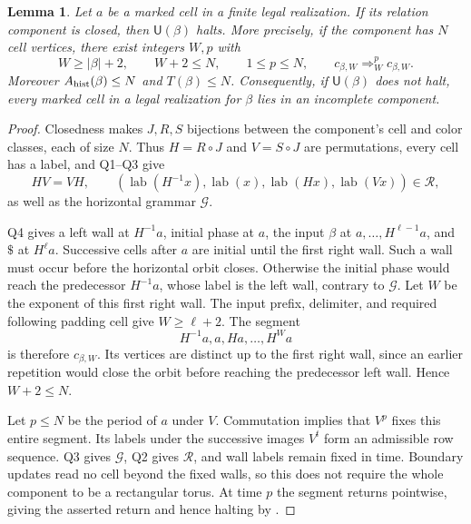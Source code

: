\documentclass[10pt]{article}
\numberwithin{equation}{section}
\newtheorem{lemma}[lemma]{Lemma}\aliascntresetthe{lemma}
\theoremstyle{definition}
\begin{document}
\begin{lemma}
\label{lem:two-type-closed-recovery}
Let $a$ be a marked cell in a finite legal realization. If its relation component is closed, then $\mathsf U(\beta)$ halts. More precisely, if the component has $N$ cell vertices, there exist integers $W,p$ with
\[
 W\ge|\beta|+2,\qquad W+2\le N,\qquad1\le p\le N,
 \qquad c_{\beta,W}\Rightarrow_W^p c_{\beta,W}.
\]
Moreover $A_{\rm hist}(\beta)\le N$ and $T(\beta)\le N$. Consequently, if $\mathsf U(\beta)$ does not halt, every marked cell in a legal realization for $\beta$ lies in an incomplete component.
\end{lemma}
\begin{proof}
Closedness makes $J,R,S$ bijections between the component's cell and color classes, each of size $N$. Thus $H=R\circ J$ and $V=S\circ J$ are permutations, every cell has a label, and Q1--Q3 give
\[
 HV=VH,\qquad
 (\operatorname{lab}(H^{-1}x),\operatorname{lab}(x),
 \operatorname{lab}(Hx),\operatorname{lab}(Vx))\in\mathcal R,
\]
as well as the horizontal grammar $\mathcal G$.

Q4 gives a left wall at $H^{-1}a$, initial phase at $a$, the input $\beta$ at $a,\ldots,H^{\ell-1}a$, and $\mathtt\$$ at $H^\ell a$. Successive cells after $a$ are initial until the first right wall. Such a wall must occur before the horizontal orbit closes. Otherwise the initial phase would reach the predecessor $H^{-1}a$, whose label is the left wall, contrary to $\mathcal G$. Let $W$ be the exponent of this first right wall. The input prefix, delimiter, and required following padding cell give $W\ge\ell+2$. The segment
\[
 H^{-1}a,a,Ha,\ldots,H^W a
\]
is therefore $c_{\beta,W}$. Its vertices are distinct up to the first right wall, since an earlier repetition would close the orbit before reaching the predecessor left wall. Hence $W+2\le N$.

Let $p\le N$ be the period of $a$ under $V$. Commutation implies that $V^p$ fixes this entire segment. Its labels under the successive images $V^t$ form an admissible row sequence. Q3 gives $\mathcal G$, Q2 gives $\mathcal R$, and wall labels remain fixed in time. Boundary updates read no cell beyond the fixed walls, so this does not require the whole component to be a rectangular torus. At time $p$ the segment returns pointwise, giving the asserted return and hence halting by .


\end{proof}
\end{document}
